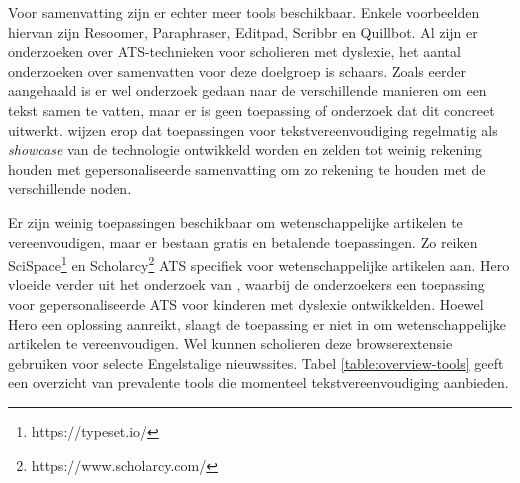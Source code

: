 \medspace

Voor samenvatting zijn er echter meer tools beschikbaar. Enkele voorbeelden hiervan zijn Resoomer, Paraphraser, Editpad, Scribbr en Quillbot. Al zijn er onderzoeken over ATS-technieken voor scholieren met dyslexie, het aantal onderzoeken over samenvatten voor deze doelgroep is schaars. Zoals eerder aangehaald is er wel onderzoek gedaan naar de verschillende manieren om een tekst samen te vatten, maar er is geen toepassing of onderzoek dat dit concreet uitwerkt. \textcite{Sanja2021} wijzen erop dat toepassingen voor tekstvereenvoudiging regelmatig als \textit{showcase} van de technologie ontwikkeld worden en zelden tot weinig rekening houden met gepersonaliseerde samenvatting om zo rekening te houden met de verschillende noden.

\medspace

Er zijn weinig toepassingen beschikbaar om wetenschappelijke artikelen te vereenvoudigen, maar er bestaan gratis en betalende toepassingen. Zo reiken SciSpace\footnote{https://typeset.io/} en Scholarcy\footnote{https://www.scholarcy.com/} ATS specifiek voor wetenschappelijke artikelen aan. Hero vloeide verder uit het onderzoek van \textcite{Bingel2018}, waarbij de onderzoekers een toepassing voor gepersonaliseerde ATS voor kinderen met dyslexie ontwikkelden. Hoewel Hero een oplossing aanreikt, slaagt de toepassing er niet in om wetenschappelijke artikelen te vereenvoudigen. Wel kunnen scholieren deze browserextensie gebruiken voor selecte Engelstalige nieuwssites. Tabel \ref{table:overview-tools} geeft een overzicht van prevalente tools die momenteel tekstvereenvoudiging aanbieden.


